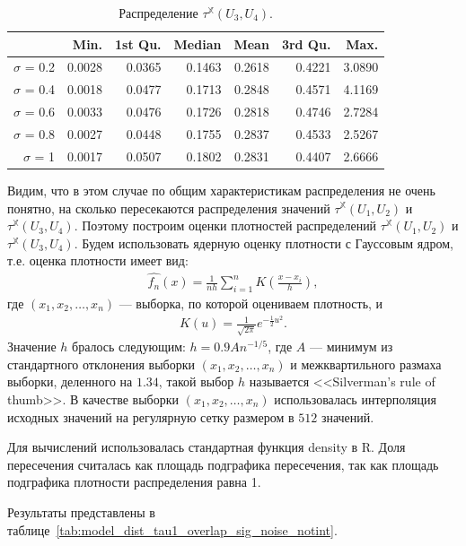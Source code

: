 \documentclass[specialist,
               substylefile = spbu.rtx,
               subf,href,colorlinks=true, 12pt]{disser}
\begin{document}
\begin{table}[hhh!]
\caption{Распределение $\tau^{\mathbb{X}}(U_3, U_4)$.}
\centering
\begin{tabular}{rrrrrrr}
  \hline
 & Min. & 1st Qu. & Median & Mean & 3rd Qu. & Max. \\
  \hline
$\sigma$ = 0.2 & 0.0028 & 0.0365 & 0.1463 & 0.2618 & 0.4221 & 3.0890 \\ 
  $\sigma$ = 0.4 & 0.0018 & 0.0477 & 0.1713 & 0.2848 & 0.4571 & 4.1169 \\ 
  $\sigma$ = 0.6 & 0.0033 & 0.0476 & 0.1726 & 0.2818 & 0.4746 & 2.7284 \\ 
  $\sigma$ = 0.8 & 0.0027 & 0.0448 & 0.1755 & 0.2837 & 0.4533 & 2.5267 \\ 
  $\sigma$ = 1 & 0.0017 & 0.0507 & 0.1802 & 0.2831 & 0.4407 & 2.6666 \\ 
   \hline
\end{tabular}
\label{tab:model_dist_tau1_sig_noise_notint2}
\end{table}

Видим, что в этом случае по общим характеристикам распределения не очень понятно, на сколько пересекаются распределения значений $\tau^{\mathbb{X}}(U_1, U_2)$ и  $\tau^{\mathbb{X}}(U_3, U_4)$.
Поэтому построим оценки плотностей распределений $\tau^{\mathbb{X}}(U_1, U_2)$ и  $\tau^{\mathbb{X}}(U_3, U_4)$.
Будем использовать ядерную оценку плотности с Гауссовым ядром, т.е. оценка плотности имеет вид:
\begin{gather*}
\hat{f_n}(x) = \frac{1}{nh} \sum_{i = 1}^{n}{K\left(\frac{x - x_i}{h}\right)},
\end{gather*}
где $(x_1,x_2,\ldots,x_n)$ --- выборка, по которой оцениваем плотность, и
\begin{gather*}
K(u) = \frac{1}{\sqrt{2\pi}}{e^{-\frac{1}{2}u^2}}.
\end{gather*}
Значение $h$ бралось следующим: $h = 0.9 A n^{-1/5}$, где $A$ --- минимум из стандартного отклонения выборки $(x_1,x_2,\ldots,x_n)$ и межквартильного размаха выборки, деленного на $1.34$, такой выбор $h$ называется <<Silverman’s rule of thumb>>. В качестве выборки $(x_1,x_2,\ldots,x_n)$ использовалась интерполяция исходных значений на регулярную сетку размером в $512$ значений.

Для вычислений использовалась стандартная функция density в R.
Доля пересечения считалась как площадь подграфика пересечения, так как площадь подграфика плотности распределения равна 1.

Результаты представлены в таблице~\ref{tab:model_dist_tau1_overlap_sig_noise_notint}.
\end{document}
